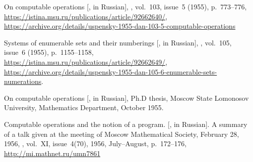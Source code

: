 \documentclass[12pt]{article}
\theoremstyle{remark}
\newcommand{\bibquote}[1]{}
\newcommand{\nb}[1]{{\color{red}}}
\begin{document}
\begin{thebibliography}{99}
On computable operations [, in Russian], \emph{}, vol.~103, issue~5 (1955), p.~773--776, \url{https://istina.msu.ru/publications/article/92662640/},  \url{https://archive.org/details/uspensky-1955-dan-103-5-computable-operations}

Systems of enumerable sets and their numberings [, in Russian], \emph{}, vol.~105, issue~6 (1955), p.~1155--1158, \url{https://istina.msu.ru/publications/article/92662649/}, \url{https://archive.org/details/uspensky-1955-dan-105-6-enumerable-sets-numerations}.

 On computable operations [, in Russian], Ph.D thesis, Moscow State Lomonosov University, Mathematics Department, October 1955.

 Computable operations and the notion of a program. [, in Russian]. A summary of a talk given at the meeting of Moscow Mathematical Society, February 28, 1956,  \emph{}, vol.~XI, issue~4(70), 1956, July--August, p.~172--176, \url{http://mi.mathnet.ru/umn7861}

\bibquote{\nb{\rus{Потенциально вычислимая нумерация вычислимых функций: универсальная функция вычислима; вполне накрывающая --- если сводится всякая потенциально вычислимая, главная второго рода --- если потенциально вычислима и вполне накрывающая. Существуют потенциально вычислимые нумерации, являющиеся вполне накрывающими, а также не являющиеся таковыми. <<Соображения этого пункта дают основания предложить понятие главной нумерации второго рода в качестве уточнения понятия ``способ программирования''>>. Конструктивные операторы: преобразования вычислимых функций в вычислимые, для которых существует вычислимое преобразование номеров в главной нумерации. Вычислимые операторы: определены на всех частичных функциях, соответствуют операторам перечисления на графиках (рекурсивные операторы в смысле Роджерса~\cite{Rogers1972}). Теорема 1: оператор, продолжаемый до вычислимого, является конструктивным. Теорема 2: всякий конструктивный оператор продолжается до вычислимого.  Теорема 3: если потенциально вычислимая нумерация такова, что всякий вычислимый оператор является относительно неё конструктивным, то эта нумерация главная. (Теорема отсутствует в заметке~\cite{1955a}.) Теорема 4: всякое нетривиальное разбиение множества функций на две части задаёт неразрешимое разбиение номеров в главной нумерации второго рода. Интерпретация как связности пространства.}}} 


\end{thebibliography}
\end{document}
